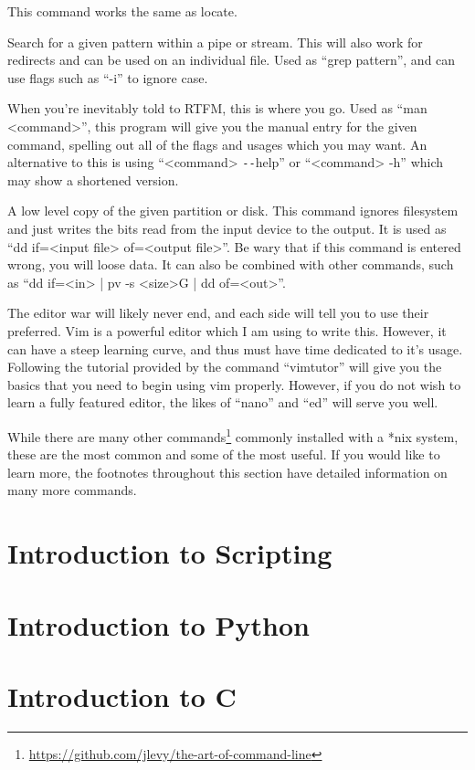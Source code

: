 \documentclass[a4paper,11pt]{report}
\begin{document}
\begin{description}
				This command works the same as locate. 
			\item[grep]
				Search for a given pattern within a pipe or stream. 
				This will also work for redirects and can be used on an individual file. 
				Used as ``grep pattern'', and can use flags such as ``-i'' to ignore case. 
			\item[man\footnote{\url{http://linux.die.net/man/}}]
				When you're inevitably told to RTFM, this is where you go. 
				Used as ``man <command>'', this program will give you the manual entry for the given command, spelling out all of the flags and usages which you may want. 
				An alternative to this is using ``<command> \verb+--+help'' or ``<command> -h'' which may show a shortened version. 
			\item[dd]
				A low level copy of the given partition or disk. 
				This command ignores filesystem and just writes the bits read from the input device to the output. 
				It is used as ``dd if=<input file> of=<output file>''.
				Be wary that if this command is entered wrong, you will loose data. 
				It can also be combined with other commands, such as ``dd if=<in> | pv -s <size>G | dd of=<out>''.
			\item[vim]
				The editor war will likely never end, and each side will tell you to use their preferred. 
				Vim is a powerful editor which I am using to write this. 
				However, it can have a steep learning curve, and thus must have time dedicated to it's usage. 
				Following the tutorial provided by the command ``vimtutor'' will give you the basics that you need to begin using vim properly. 
				However, if you do not wish to learn a fully featured editor, the likes of ``nano'' and ``ed'' will serve you well. 
		\end{description}
		While there are many other commands\footnote{\url{https://github.com/jlevy/the-art-of-command-line}} commonly installed with a \**nix system, these are the most common and some of the most useful. If you would like to learn more, the footnotes throughout this section have detailed information on many more commands. 

	\section{Introduction to Scripting}
	\section{Introduction to Python}
	\section{Introduction to C}
\end{document}
